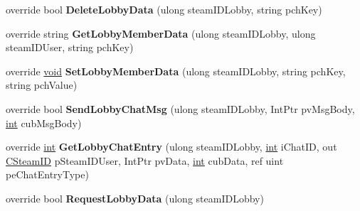 \begin{DoxyCompactItemize}
\item 
\hypertarget{classValve_1_1Steamworks_1_1CSteamMatchmaking_a455af6b208aaea58081859628a107797}{}override bool {\bfseries Delete\+Lobby\+Data} (ulong steam\+I\+D\+Lobby, string pch\+Key)\label{classValve_1_1Steamworks_1_1CSteamMatchmaking_a455af6b208aaea58081859628a107797}

\item 
\hypertarget{classValve_1_1Steamworks_1_1CSteamMatchmaking_a146ecd606c3ba777e37f3677016ff395}{}override string {\bfseries Get\+Lobby\+Member\+Data} (ulong steam\+I\+D\+Lobby, ulong steam\+I\+D\+User, string pch\+Key)\label{classValve_1_1Steamworks_1_1CSteamMatchmaking_a146ecd606c3ba777e37f3677016ff395}

\item 
\hypertarget{classValve_1_1Steamworks_1_1CSteamMatchmaking_ae92ee6b1633525f168c0503c96350db7}{}override \hyperlink{SDL__audio_8h_a52835ae37c4bb905b903cbaf5d04b05f}{void} {\bfseries Set\+Lobby\+Member\+Data} (ulong steam\+I\+D\+Lobby, string pch\+Key, string pch\+Value)\label{classValve_1_1Steamworks_1_1CSteamMatchmaking_ae92ee6b1633525f168c0503c96350db7}

\item 
\hypertarget{classValve_1_1Steamworks_1_1CSteamMatchmaking_a997486a86f2ded36c11f42babe2d7bdb}{}override bool {\bfseries Send\+Lobby\+Chat\+Msg} (ulong steam\+I\+D\+Lobby, Int\+Ptr pv\+Msg\+Body, \hyperlink{SDL__thread_8h_a6a64f9be4433e4de6e2f2f548cf3c08e}{int} cub\+Msg\+Body)\label{classValve_1_1Steamworks_1_1CSteamMatchmaking_a997486a86f2ded36c11f42babe2d7bdb}

\item 
\hypertarget{classValve_1_1Steamworks_1_1CSteamMatchmaking_ad7163499d9454d76a8f23bef413f0b8b}{}override \hyperlink{SDL__thread_8h_a6a64f9be4433e4de6e2f2f548cf3c08e}{int} {\bfseries Get\+Lobby\+Chat\+Entry} (ulong steam\+I\+D\+Lobby, \hyperlink{SDL__thread_8h_a6a64f9be4433e4de6e2f2f548cf3c08e}{int} i\+Chat\+I\+D, out \hyperlink{structValve_1_1Steamworks_1_1CSteamID}{C\+Steam\+I\+D} p\+Steam\+I\+D\+User, Int\+Ptr pv\+Data, \hyperlink{SDL__thread_8h_a6a64f9be4433e4de6e2f2f548cf3c08e}{int} cub\+Data, ref uint pe\+Chat\+Entry\+Type)\label{classValve_1_1Steamworks_1_1CSteamMatchmaking_ad7163499d9454d76a8f23bef413f0b8b}

\item 
\hypertarget{classValve_1_1Steamworks_1_1CSteamMatchmaking_ab2b1d1c01666607e4ef2e10aed13297e}{}override bool {\bfseries Request\+Lobby\+Data} (ulong steam\+I\+D\+Lobby)\label{classValve_1_1Steamworks_1_1CSteamMatchmaking_ab2b1d1c01666607e4ef2e10aed13297e}


\end{DoxyCompactItemize}
